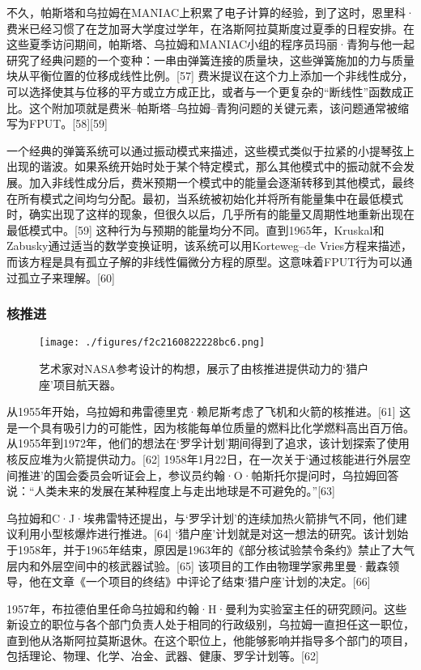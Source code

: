 不久，帕斯塔和乌拉姆在MANIAC上积累了电子计算的经验，到了这时，恩里科·费米已经习惯了在芝加哥大学度过学年，在洛斯阿拉莫斯度过夏季的日程安排。在这些夏季访问期间，帕斯塔、乌拉姆和MANIAC小组的程序员玛丽·青狗与他一起研究了经典问题的一个变种：一串由弹簧连接的质量块，这些弹簧施加的力与质量块从平衡位置的位移成线性比例。[57] 费米提议在这个力上添加一个非线性成分，可以选择使其与位移的平方或立方成正比，或者与一个更复杂的“断线性”函数成正比。这个附加项就是费米–帕斯塔–乌拉姆–青狗问题的关键元素，该问题通常被缩写为FPUT。[58][59]

一个经典的弹簧系统可以通过振动模式来描述，这些模式类似于拉紧的小提琴弦上出现的谐波。如果系统开始时处于某个特定模式，那么其他模式中的振动就不会发展。加入非线性成分后，费米预期一个模式中的能量会逐渐转移到其他模式，最终在所有模式之间均匀分配。最初，当系统被初始化并将所有能量集中在最低模式时，确实出现了这样的现象，但很久以后，几乎所有的能量又周期性地重新出现在最低模式中。[59] 这种行为与预期的能量均分不同。直到1965年，Kruskal和Zabusky通过适当的数学变换证明，该系统可以用Korteweg–de Vries方程来描述，而该方程是具有孤立子解的非线性偏微分方程的原型。这意味着FPUT行为可以通过孤立子来理解。[60]
\subsubsection{核推进}
\begin{figure}[ht]
\centering
\texttt{[image: ./figures/f2c2160822228bc6.png]}
\caption{艺术家对NASA参考设计的构想，展示了由核推进提供动力的‘猎户座’项目航天器。} \label{fig_Ulam_7}
\end{figure}
从1955年开始，乌拉姆和弗雷德里克·赖尼斯考虑了飞机和火箭的核推进。[61] 这是一个具有吸引力的可能性，因为核能每单位质量的燃料比化学燃料高出百万倍。从1955年到1972年，他们的想法在‘罗孚计划’期间得到了追求，该计划探索了使用核反应堆为火箭提供动力。[62] 1958年1月22日，在一次关于‘通过核能进行外层空间推进’的国会委员会听证会上，参议员约翰·O·帕斯托尔提问时，乌拉姆回答说：“人类未来的发展在某种程度上与走出地球是不可避免的。”[63]

乌拉姆和C·J·埃弗雷特还提出，与‘罗孚计划’的连续加热火箭排气不同，他们建议利用小型核爆炸进行推进。[64] ‘猎户座’计划就是对这一想法的研究。该计划始于1958年，并于1965年结束，原因是1963年的《部分核试验禁令条约》禁止了大气层内和外层空间中的核武器试验。[65] 该项目的工作由物理学家弗里曼·戴森领导，他在文章《一个项目的终结》中评论了结束‘猎户座’计划的决定。[66]

1957年，布拉德伯里任命乌拉姆和约翰·H·曼利为实验室主任的研究顾问。这些新设立的职位与各个部门负责人处于相同的行政级别，乌拉姆一直担任这一职位，直到他从洛斯阿拉莫斯退休。在这个职位上，他能够影响并指导多个部门的项目，包括理论、物理、化学、冶金、武器、健康、罗孚计划等。[62]

